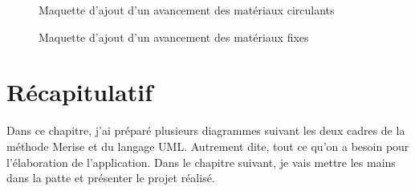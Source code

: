 \documentclass[a4paper]{report}
\begin{document}
\begin{doublespace}
	\begin{figure}[H]
		\begin{center}
			\caption{Maquette d'ajout d'un avancement des matériaux circulants}
		\end{center}
	\end{figure}

	\begin{figure}[H]
		\begin{center}
			\caption{Maquette d'ajout d'un avancement des matériaux fixes}
		\end{center}
	\end{figure}

	\section{Récapitulatif}

	Dans ce chapitre, j'ai préparé plusieurs diagrammes suivant les deux cadres de la méthode Merise et du langage UML.
	Autrement dite, tout ce qu’on a besoin pour l'élaboration de l’application. Dans le chapitre suivant,
	je vais mettre les mains dans la patte et présenter le projet réalisé.

\end{doublespace}
\end{document}

